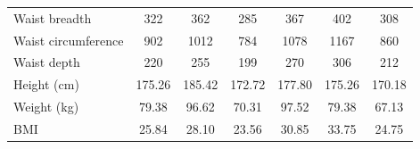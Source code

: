 \documentclass[12pt,a4paper,openany,UKenglish]{scrreprt}
\begin{document}
\begin{table}[H]
\begin{tabular}{lcccccc}
		Waist breadth                & 322                                  & 362        & 285        & 367        & 402        & 308        \\
		Waist circumference          & 902                                  & 1012       & 784        & 1078       & 1167       & 860        \\
		Waist depth                  & 220                                  & 255        & 199        & 270        & 306        & 212        \\
		\hline
		Height (cm)                  & 175.26                               & 185.42     & 172.72     & 177.80     & 175.26     & 170.18     \\
		Weight (kg)                  & 79.38                                & 96.62      & 70.31      & 97.52      & 79.38      & 67.13      \\
		BMI                          & 25.84                                & 28.10      & 23.56      & 30.85      & 33.75      & 24.75
	\end{tabular}
\end{table}
\end{document}
